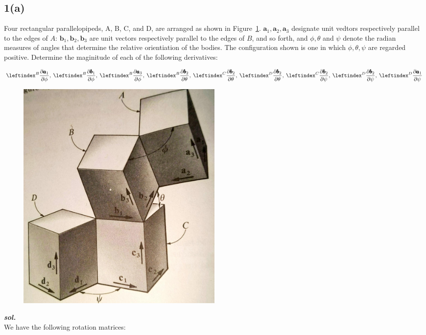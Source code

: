 \subsection{1(a)}
Four rectangular parallelopipeds, A, B, C, and D, are arranged as shown in Figure~\ref{1_a}.
$\pmb a_1, \pmb a_2, \pmb a_3$ designate unit vedtors respectively parallel to the edges of $A$: $\pmb b_1, \pmb b_2, \pmb b_3$ are unit vectors respectively parallel to the edges of $B$, and so forth, and $\phi, \theta$ and $\psi$ denote the radian measures of angles that determine the relative orientiation of the bodies.
The configuration shown is one in which $\phi, \theta, \psi$ are regarded positive. Determine the maginitude of each of the following derivatives:

\begin{align*}
  \lx{^B}{\frac {\partial \pmb a_1}  {\partial \phi}}, \:
  \lx{^B}{\frac {\partial \pmb b_1}  {\partial \phi}}, \:
  \lx{^B}{\frac {\partial \pmb a_3}  {\partial \phi}}, \:
  \lx{^B}{\frac {\partial \pmb b_2}  {\partial \theta}}, \:
  \lx{^C}{\frac {\partial \pmb b_2}  {\partial \theta}}, \:
  \lx{^D}{\frac {\partial \pmb b_2}  {\partial \theta}}, \:
  \lx{^C}{\frac {\partial \pmb b_2}  {\partial \psi}}, \:
  \lx{^D}{\frac {\partial \pmb b_2}  {\partial \psi}}, \:
  \lx{^D}{\frac {\partial \pmb a_1}  {\partial \psi}}
\end{align*}

\begin{figure}[H]
    \centering
    \includegraphics[width = 0.5\textwidth, height = 0.5\textwidth]{./figs/ProbSet_1/1_a.jpg}
    \caption{}
    \label{1_a}
\end{figure}


\textbf{\textit{sol.}}\\

We have the following rotation matrices:

